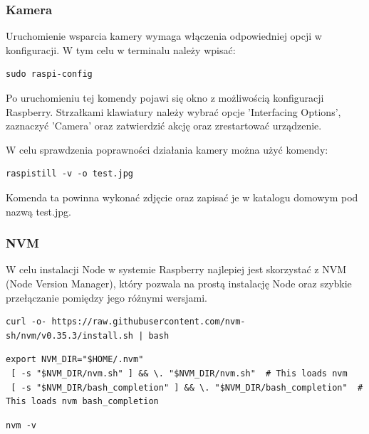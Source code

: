 \subsubsection{Kamera}

Uruchomienie wsparcia kamery wymaga włączenia odpowiedniej opcji w konfiguracji. W tym celu w terminalu należy wpisać:

\begin{lstlisting}[caption={Uruchomienie ekranu konfiguracji Raspberry Pi}]
sudo raspi-config
\end{lstlisting}

Po uruchomieniu tej komendy pojawi się okno z możliwością konfiguracji Raspberry. Strzałkami klawiatury należy wybrać opcje 'Interfacing Options',  zaznaczyć 'Camera' oraz zatwierdzić akcję oraz zrestartować urządzenie.

W celu sprawdzenia poprawności działania kamery można użyć komendy:

\begin{lstlisting}[caption={Wykonanie zdjęcia na Raspberry Pi}]
raspistill -v -o test.jpg
\end{lstlisting}

Komenda ta powinna wykonać zdjęcie oraz zapisać je w katalogu domowym pod nazwą test.jpg.

\subsubsection{NVM}

W celu instalacji Node w systemie Raspberry najlepiej jest skorzystać z NVM (Node Version Manager), który pozwala na prostą instalację Node oraz szybkie przełączanie pomiędzy jego różnymi wersjami.

\begin{lstlisting}[caption={Pobranie NVM}]
curl -o- https://raw.githubusercontent.com/nvm-sh/nvm/v0.35.3/install.sh | bash
\end{lstlisting}

\begin{lstlisting}[caption={Konfiguracja NVM}]
export NVM_DIR="$HOME/.nvm"
 [ -s "$NVM_DIR/nvm.sh" ] && \. "$NVM_DIR/nvm.sh"  # This loads nvm
 [ -s "$NVM_DIR/bash_completion" ] && \. "$NVM_DIR/bash_completion"  # This loads nvm bash_completion
\end{lstlisting}

\begin{lstlisting}[caption={Sprawdzenie działania NVM}]
nvm -v
\end{lstlisting}

